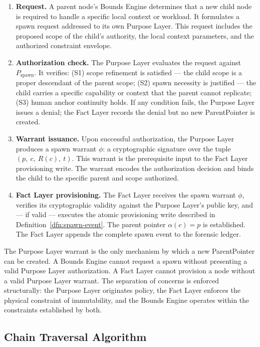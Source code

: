 \begin{enumerate}
    \item \textbf{Request.} A parent node's Bounds Engine determines that a new child node is required to handle a specific local context or workload. It formulates a spawn request addressed to its own Purpose Layer. This request includes the proposed scope of the child's authority, the local context parameters, and the authorized constraint envelope.
    \item \textbf{Authorization check.} The Purpose Layer evaluates the request against $P_{\mathrm{spawn}}$. It verifies: (S1) scope refinement is satisfied — the child scope is a proper descendant of the parent scope; (S2) spawn necessity is justified — the child carries a specific capability or context that the parent cannot replicate; (S3) human anchor continuity holds. If any condition fails, the Purpose Layer issues a denial; the Fact Layer records the denial but no new ParentPointer is created.
    \item \textbf{Warrant issuance.} Upon successful authorization, the Purpose Layer produces a spawn warrant $\phi$: a cryptographic signature over the tuple $(p,\ c,\ R(c),\ t)$. This warrant is the prerequisite input to the Fact Layer provisioning write. The warrant encodes the authorization decision and binds the child to the specific parent and scope authorized.
    \item \textbf{Fact Layer provisioning.} The Fact Layer receives the spawn warrant $\phi$, verifies its cryptographic validity against the Purpose Layer's public key, and — if valid — executes the atomic provisioning write described in Definition~\ref{dfn:spawn-event}. The parent pointer $\alpha(c) = p$ is established. The Fact Layer appends the complete spawn event to the forensic ledger.
\end{enumerate}

The Purpose Layer warrant is the only mechanism by which a new ParentPointer can be created. A Bounds Engine cannot request a spawn without presenting a valid Purpose Layer authorization. A Fact Layer cannot provision a node without a valid Purpose Layer warrant. The separation of concerns is enforced structurally: the Purpose Layer originates policy, the Fact Layer enforces the physical constraint of immutability, and the Bounds Engine operates within the constraints established by both.

\subsection{Chain Traversal Algorithm}
\label{sec:chain-traversal-algorithm}


